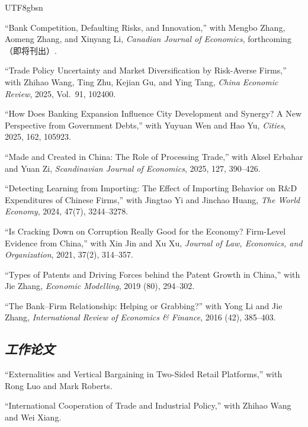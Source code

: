 \documentclass[letterpaper]{article}
\begin{document}
\begin{CJK}{UTF8}{gbsn}
\begin{papers}
\item ``Bank Competition, Defaulting Risks, and Innovation,'' with Mengbo Zhang, Aomeng Zhang, and Xinyang Li, \textit{Canadian Journal of Economics}, forthcoming（即将刊出）.

\item ``Trade Policy Uncertainty and Market Diversification by Risk-Averse Firms,'' with Zhihao Wang, Ting Zhu, Kejian Gu, and Ying Tang, \textit{China Economic Review}, 2025, Vol.\ 91, 102400.

\item ``How Does Banking Expansion Influence City Development and Synergy? A New Perspective from Government Debts,'' with Yuyuan Wen and Hao Yu, \textit{Cities}, 2025, 162, 105923.

\item ``Made and Created in China: The Role of Processing Trade,'' with Aksel Erbahar and Yuan Zi, \textit{Scandinavian Journal of Economics}, 2025, 127, 390--426.

\item ``Detecting Learning from Importing: The Effect of Importing Behavior on R\&D Expenditures of Chinese Firms,'' with Jingtao Yi and Jinchao Huang, \textit{The World Economy}, 2024, 47(7), 3244--3278.

\item ``Is Cracking Down on Corruption Really Good for the Economy? Firm-Level Evidence from China,'' with Xin Jin and Xu Xu, \textit{Journal of Law, Economics, and Organization}, 2021, 37(2), 314--357.

\item ``Types of Patents and Driving Forces behind the Patent Growth in China,'' with Jie Zhang, \textit{Economic Modelling}, 2019 (80), 294--302.

\item ``The Bank--Firm Relationship: Helping or Grabbing?'' with Yong Li and Jie Zhang, \textit{International Review of Economics \& Finance}, 2016 (42), 385--403.
\end{papers}

\subsection*{\textit{工作论文}}
\begin{papers}
\item ``Externalities and Vertical Bargaining in Two-Sided Retail Platforms,'' with Rong Luo and Mark Roberts.

\item ``International Cooperation of Trade and Industrial Policy,'' with Zhihao Wang and Wei Xiang.


\end{papers}
\end{CJK}
\end{document}
